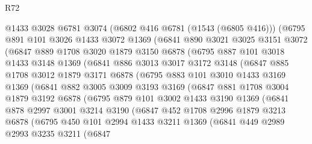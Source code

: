 \begin{lexlean}{R72}
\begin{coremodule}
      @1433
      @3028
      @6781
      @3074
      (@6802 @416 @6781 (@1543 (@6805 @416)))
      (@6795
        @891
        @101
        @3026
        @1433
        @3072
        @1369
        (@6841
          @890
          @3021
          @3025
          @3151
          @3072
          (@6847
            @889
            @1708
            @3020
            @1879
            @3150
            @6878
            (@6795
              @887
              @101
              @3018
              @1433
              @3148
              @1369
              (@6841
                @886
                @3013
                @3017
                @3172
                @3148
                (@6847
                  @885
                  @1708
                  @3012
                  @1879
                  @3171
                  @6878
                  (@6795
                    @883
                    @101
                    @3010
                    @1433
                    @3169
                    @1369
                    (@6841
                      @882
                      @3005
                      @3009
                      @3193
                      @3169
                      (@6847
                        @881
                        @1708
                        @3004
                        @1879
                        @3192
                        @6878
                        (@6795
                          @879
                          @101
                          @3002
                          @1433
                          @3190
                          @1369
                          (@6841
                            @878
                            @2997
                            @3001
                            @3214
                            @3190
                            (@6847
                              @452
                              @1708
                              @2996
                              @1879
                              @3213
                              @6878
                              (@6795
                                @450
                                @101
                                @2994
                                @1433
                                @3211
                                @1369
                                (@6841
                                  @449
                                  @2989
                                  @2993
                                  @3235
                                  @3211
                                  (@6847

\end{coremodule}
\end{lexlean}
